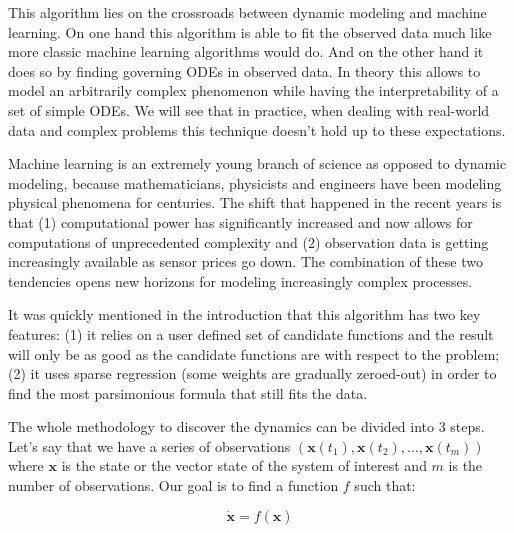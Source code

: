 \documentclass[12pt, letterpaper]{article}
\begin{document}
This algorithm lies on the crossroads between dynamic modeling and machine learning. 
On one hand this algorithm is able to fit the observed data much like more classic machine learning algorithms would do. 
And on the other hand it does so by finding governing ODEs in observed data. 
In theory this allows to model an arbitrarily complex phenomenon while having the interpretability of a set of simple ODEs. 
We will see that in practice, when dealing with real-world data and complex problems this technique doesn't hold up to these expectations.

Machine learning is an extremely young branch of science as opposed to dynamic modeling, because mathematicians, physicists and engineers have been modeling physical phenomena for centuries. 
The shift that happened in the recent years is that (1) computational power has significantly increased and now allows for computations of unprecedented complexity and (2) observation data is getting increasingly available as sensor prices go down. 
The combination of these two tendencies opens new horizons for modeling increasingly complex processes.  


It was quickly mentioned in the introduction that this algorithm has two key features: (1) it relies on a user defined set of candidate functions and the result will only be as good as the candidate functions are with respect to the problem; (2) it uses sparse regression (some weights are gradually zeroed-out) in order to find the most parsimonious formula that still fits the data.

The whole methodology to discover the dynamics can be divided into 3 steps. 
Let's say that we have a series of observations $(\mathbf{x}(t_1), \mathbf{x}(t_2), \dots, \mathbf{x}(t_m))$ where $\mathbf{x}$ is the state or the vector state of the system of interest and $m$ is the number of observations. 
Our goal is to find a function $f$ such that:

\begin{equation}\label{eq:diff}
\dot{\mathbf{x}} = f(\mathbf{x})
\end{equation}
\end{document}
